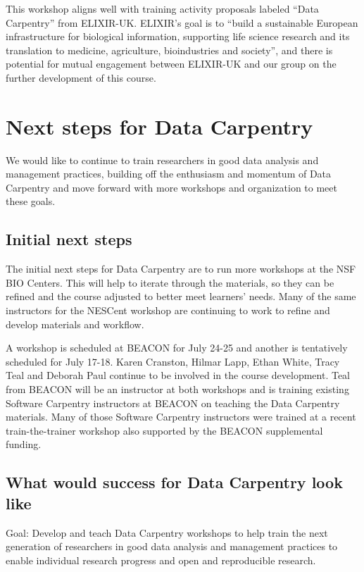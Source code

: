 \documentclass[11pt]{article}
\begin{document}
This workshop aligns well with training activity proposals labeled ``Data Carpentry'' from ELIXIR-UK. ELIXIR's goal is to ``build a sustainable European infrastructure for biological information, supporting life science research and its translation to medicine, agriculture, bioindustries and society'', and there is potential for mutual engagement between ELIXIR-UK and our group on the further development of this course. 

\section{Next steps for Data Carpentry}

We would like to continue to train researchers in good data analysis and management practices, building off the enthusiasm and momentum of Data Carpentry and move forward with more workshops and organization to meet 
these goals.

\subsection{Initial next steps}

The initial next steps for Data Carpentry are to run more workshops at the NSF BIO Centers. This will help to 
iterate through the materials, so they can be refined and the course adjusted to better meet learners' needs. Many of the same instructors for the NESCent workshop are continuing to work to refine and develop materials and workflow.

A workshop is scheduled at BEACON for July 24-25 and another is tentatively scheduled for July 17-18. Karen Cranston, Hilmar Lapp, Ethan White, Tracy Teal and Deborah Paul continue to be involved in the course development. Teal from BEACON will be an instructor at both workshops and is training existing Software Carpentry instructors at BEACON on teaching the Data Carpentry materials. Many of those Software Carpentry instructors were trained at a recent train-the-trainer workshop also supported by the BEACON supplemental funding. 

\subsection{What would success for Data Carpentry look like}

\hangindent=0.7cm Goal: Develop and teach Data Carpentry workshops to help train the next generation of researchers in good data analysis and management practices to enable individual research progress and open and reproducible research. 
\end{document}
